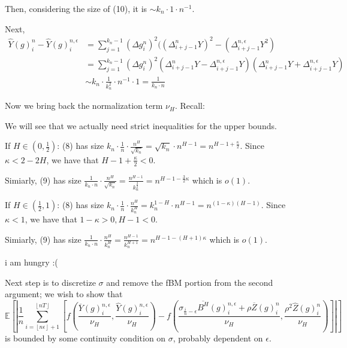 \documentclass[12pt,letterpaper]{article}
\theoremstyle{lemma}
\theoremstyle{definition}
\newcommand{\E}{\mathbb{E}}
\begin{document}
Then, considering the size of (10), it is \(\sim k_n \cdot 1 \cdot n^{-1}\).

Next,
\begin{align}
  \widehat{Y}(g)^{n}_i - \widehat{Y}(g)^{n,\epsilon}_i &= \sum_{j=1}^{k_n-1}(\Delta g^n_i)^2((\Delta_{i+j-1}^{n}Y)^2 - (\Delta_{i+j-1}^{n,\epsilon}Y^2) \\
                                                       &= \sum_{j=1}^{k_n-1}(\Delta g^n_i)^2(\Delta_{i+j-1}^{n}Y - \Delta_{i+j-1}^{n,\epsilon}Y)(\Delta_{i+j-1}^{n}Y + \Delta_{i+j-1}^{n,\epsilon}Y) \\
                                                       &\sim k_n \cdot \frac{1}{k_n^2} \cdot n^{-1} \cdot 1 = \frac{1}{k_n \cdot n}
\end{align}

Now we bring back the normalization term \(\nu_H\). Recall:

We will see that we actually need strict inequalities for the upper bounds.

If \( H \in (0, \frac{1}{2})\): (8) has size \(k_n \cdot \frac{1}{n} \cdot \frac{n^H}{\sqrt{k_n}} = \sqrt{k_n} \cdot n^{H - 1} = n^{H - 1 + \frac{\kappa}{2}}\). Since \(\kappa < 2 - 2H\), we have that \(H - 1 + \frac{\kappa}{2} < 0\).

Simiarly, (9) has size \(\frac{1}{k_n \cdot n} \cdot \frac{n^H}{\sqrt{k_n}} = \frac{n^{H-1}}{k_n^{\frac{3}{2}}} = n^{H - 1 - \frac{3}{2}\kappa}\) which is \(o(1)\).

If \( H \in (\frac{1}{2}, 1)\): (8) has size \(k_n \cdot \frac{1}{n} \cdot \frac{n^H}{k_n^H} = k_n^{1-H} \cdot n^{H - 1} = n^{(1 - \kappa)(H - 1)}\). Since \(\kappa < 1\), we have that \(1 - \kappa > 0, H - 1 < 0\).

Simiarly, (9) has size \(\frac{1}{k_n \cdot n} \cdot \frac{n^H}{k_n^H} = \frac{n^{H-1}}{k_n^{H + 1}} = n^{H - 1 - (H + 1)\kappa}\) which is \(o(1)\).

i am hungry :(

Next step is to discretize \(\sigma\) and remove the fBM portion from the second argument; we wish to show that
\begin{equation}
  \E \left[ \left| \frac{1}{n}\sum_{i=\left\lfloor n\epsilon \right\rfloor + 1}^{\left\lfloor nT \right\rfloor} \left[ f\left( \frac{\overline{Y}(g)^{n,\epsilon}_i}{\nu_H}, \frac{\widehat{Y}(g)^{n,\epsilon}_i}{\nu_H} \right) - f\left( \frac{\sigma_{\frac{i}{n}-\epsilon}\overline{B^H}(g)^{n,\epsilon}_i + \rho\overline{Z}(g)^n_i}{\nu_H}, \frac{\rho^2\widehat{Z}(g)^n_i}{\nu_H}\right)\right] \right| \right]
\end{equation}
is bounded by some continuity condition on \(\sigma\), probably dependent on \(\epsilon\).
\end{document}
